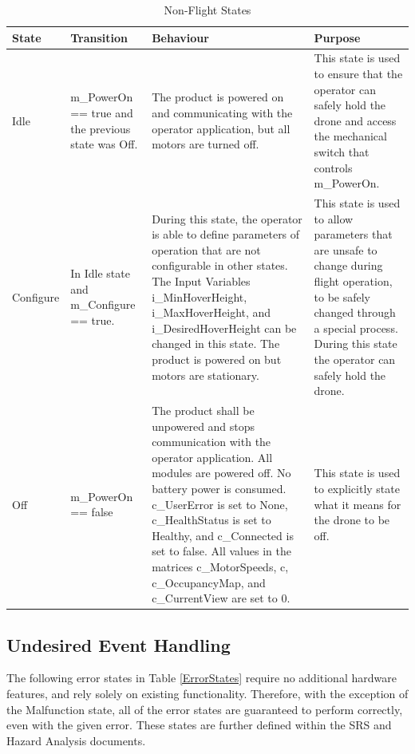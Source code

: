 \documentclass[12pt, titlepage]{article}
\begin{document}
\begin{table}[!h]
\begin{center}
\caption {Non-Flight States}
\label{NonFlightStates}
\begin{tabular}{ | m{2.1cm} | m{3cm} | m{5cm} | m{5cm} | } 
\hline
 State & Transition & Behaviour & Purpose \\ 
 \hline Idle & m_PowerOn == true and the previous state was Off. & 
    The product is powered on and communicating with the operator application, but all motors are turned off.  & 
    This state is used to ensure that the operator can safely hold the drone and access the mechanical switch that controls m\_PowerOn. \\
\hline Configure & In Idle state and m_Configure == true.	& 
    During this state, the operator is able to define parameters of operation that are not configurable in other states. The Input Variables i\_MinHoverHeight, i\_MaxHoverHeight, and i\_DesiredHoverHeight can be changed in this state. The product is powered on but motors are stationary. & 
    This state is used to allow parameters that are unsafe to change during flight operation, to be safely changed through a special process. During this state the operator can safely hold the drone. \\
\hline Off & m_PowerOn == false	& 
    The product shall be unpowered and stops communication with the operator application. All modules are powered off. No battery power is consumed. c\_UserError is set to None, c\_HealthStatus is set to Healthy, and c_Connected is set to false. All values in the matrices c\_MotorSpeeds, c, c\_OccupancyMap, and c\_CurrentView are set to 0. &
    This state is used to explicitly state what it means for the drone to be off. \\
\hline 
\end{tabular}
\end{center}
\end{table}

\clearpage

\subsection{Undesired Event Handling}
\label{subsec:UndesiredEvent}

The following error states in Table \ref{ErrorStates} require no additional hardware features, and rely solely on existing functionality. Therefore, with the exception of the Malfunction state, all of the error states are guaranteed to perform correctly, even with the given error. These states are further defined within the SRS and Hazard Analysis documents.
\end{document}
